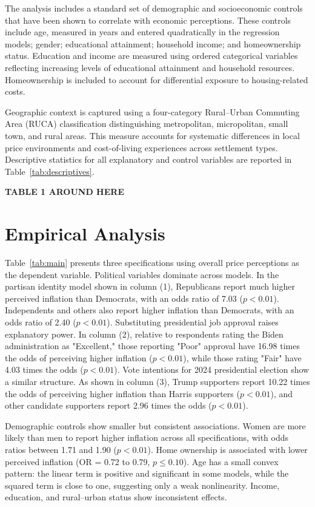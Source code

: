 \documentclass[]{interact}
\theoremstyle{plain}%
\theoremstyle{definition}
\theoremstyle{remark}
\begin{document}
The analysis includes a standard set of demographic and socioeconomic controls that have been shown to correlate with economic perceptions. These controls include age, measured in years and entered quadratically in the regression models; gender; educational attainment; household income; and homeownership status. Education and income are measured using ordered categorical variables reflecting increasing levels of educational attainment and household resources. Homeownership is included to account for differential exposure to housing-related costs.

Geographic context is captured using a four-category Rural--Urban Commuting Area (RUCA) classification distinguishing metropolitan, micropolitan, small town, and rural areas. This measure accounts for systematic differences in local price environments and cost-of-living experiences across settlement types. Descriptive statistics for all explanatory and control variables are reported in Table~\ref{tab:descriptives}.

\begin{center}
\textbf{TABLE 1 AROUND HERE}
\end{center}


\section*{Empirical Analysis}

Table~\ref{tab:main} presents three specifications using overall price perceptions as the dependent variable. Political variables dominate across models. In the partisan identity model shown in column (1), Republicans report much higher perceived inflation than Democrats, with an odds ratio of 7.03 ($p<0.01$). Independents and others also report higher inflation than Democrats, with an odds ratio of 2.40 ($p<0.01$). Substituting presidential job approval raises explanatory power. In column (2), relative to respondents rating the Biden administration as "Excellent," those reporting "Poor" approval have 16.98 times the odds of perceiving higher inflation ($p<0.01$), while those rating "Fair" have 4.03 times the odds ($p<0.01$). Vote intentions for 2024 presidential election show a similar structure. As shown in column (3), Trump supporters report 10.22 times the odds of perceiving higher inflation than Harris supporters ($p<0.01$), and other candidate supporters report 2.96 times the odds ($p<0.01$).  

Demographic controls show smaller but consistent associations. Women are more likely than men to report higher inflation across all specifications, with odds ratios between 1.71 and 1.90 ($p<0.01$). Home ownership is associated with lower perceived inflation (OR = 0.72 to 0.79, $p\leq 0.10$). Age has a small convex pattern: the linear term is positive and significant in some models, while the squared term is close to one, suggesting only a weak nonlinearity. Income, education, and rural--urban status show inconsistent effects.  
\end{document}
